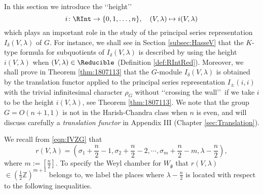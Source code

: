 In this section we introduce the 
\lq\lq{height}\rq\rq
\[
  i \colon \RInt \to \{0,1,\ldots,n\}, 
\quad
  (V, \lambda) \mapsto i(V, \lambda)
\]
which plays an important role
 in the study of the principal series representation
 $I_{\delta}(V,\lambda)$ of $G$.  
For instance, 
 we shall see in Section \ref{subsec:HasseV}
 that the $K$-type formula
 for subquotients
 of $I_{\delta}(V,\lambda)$ 
 is described by using the height $i(V,\lambda)$
 when $(V,\lambda) \in \Reducible$
 (Definition \ref{def:RIntRed}).  
Moreover,
 we shall prove in Theorem \ref{thm:1807113}
 that the $G$-module $I_{\delta}(V,\lambda)$
 is obtained by the translation functor
 applied to the principal series representation $I_{\pm}(i, i)$
 with the trivial infinitesimal character $\rho_G$
 without \lq\lq{crossing the wall}\rq\rq\
 if we take $i$ to be the height $i(V,\lambda)$, 
 see Theorem \ref{thm:1807113}.  
We note that the group $G=O(n+1,1)$
 is not in the Harish-Chandra class 
 when $n$ is even, 
 and will discuss carefully
 a {\it{translation functor}}
 in Appendix III
 (Chapter \ref{sec:Translation}).  



We recall from \eqref{eqn:IVZG}
 that 
\[
   r(V,\lambda)=(\sigma_1+\frac n 2-1, \sigma_2 + \frac n 2-2, \cdots, \sigma_m + \frac n 2-m, \lambda-\frac n 2), 
\]
where $m:=[\frac n 2]$.  
To specify the Weyl chamber for $W_{\mathfrak{g}}$
 that $r(V,\lambda)$ $\in (\frac 1 2 {\mathbb{Z}})^{m+1}$ belongs to, 
 we label the places
 where $\lambda-\frac n 2$ is located
 with respect to the following inequalities.  

